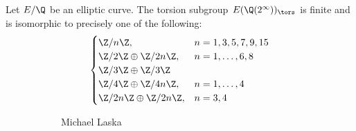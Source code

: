 \begin{frame}[plain]
\begin{thm}
Let $E/\Q$ be an elliptic curve. The torsion subgroup $E(\Q(2^\infty))_\tors$ is finite and is isomorphic to precisely one of the following:
	\[
	\begin{cases}
	\Z/n\Z, & n=1,3,5,7,9,15 \\
	\Z/2\Z \oplus \Z/2n\Z, & n= 1,\ldots,6,8 \\
	\Z/3\Z \oplus \Z/3\Z \\
	\Z/4\Z \oplus \Z/4n\Z, & n= 1,\ldots,4 \\
	\Z/2n\Z \oplus \Z/2n\Z, & n= 3,4
	\end{cases}
	\]
\end{thm}
	\begin{figure}[h]
	\centering
	\begin{subfigure}{0.3\textwidth}
	\captionsetup{labelformat=empty}
	\centering
	\caption{Michael Laska}
	\end{subfigure}
	\begin{subfigure}{0.3\textwidth}

\end{subfigure}
\end{figure}
\end{frame}
